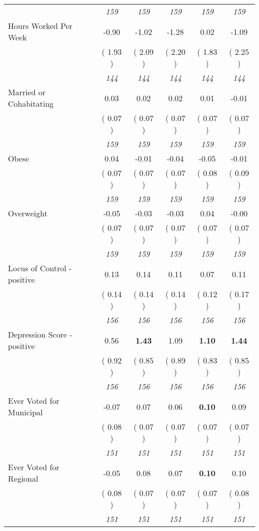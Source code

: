 \begin{tabular}{l c c c c c}
& \textit{ 159 } & \textit{ 159 } & \textit{ 159 } & \textit{ 159 } & \textit{ 159 } \\
Hours Worked Per Week &     -0.90 &     -1.02 &     -1.28 &      0.02 &     -1.09 \\
& (     1.93 ) & (     2.09 ) & (     2.20 ) & (     1.83 ) & (     2.25 ) \\
& \textit{ 144 } & \textit{ 144 } & \textit{ 144 } & \textit{ 144 } & \textit{ 144 } \\
Married or Cohabitating &      0.03 &      0.02 &      0.02 &      0.01 &     -0.01 \\
& (     0.07 ) & (     0.07 ) & (     0.07 ) & (     0.07 ) & (     0.07 ) \\
& \textit{ 159 } & \textit{ 159 } & \textit{ 159 } & \textit{ 159 } & \textit{ 159 } \\
Obese &      0.04 &     -0.01 &     -0.04 &     -0.05 &     -0.01 \\
& (     0.07 ) & (     0.07 ) & (     0.07 ) & (     0.08 ) & (     0.09 ) \\
& \textit{ 159 } & \textit{ 159 } & \textit{ 159 } & \textit{ 159 } & \textit{ 159 } \\
Overweight &     -0.05 &     -0.03 &     -0.03 &      0.04 &     -0.00 \\
& (     0.07 ) & (     0.07 ) & (     0.07 ) & (     0.07 ) & (     0.07 ) \\
& \textit{ 159 } & \textit{ 159 } & \textit{ 159 } & \textit{ 159 } & \textit{ 159 } \\
Locus of Control - positive &      0.13 &      0.14 &      0.11 &      0.07 &      0.11 \\
& (     0.14 ) & (     0.14 ) & (     0.14 ) & (     0.12 ) & (     0.17 ) \\
& \textit{ 156 } & \textit{ 156 } & \textit{ 156 } & \textit{ 156 } & \textit{ 156 } \\
Depression Score - positive &      0.56 & \textbf{      1.43 } &      1.09 & \textbf{     1.10} & \textbf{     1.44} \\
& (     0.92 ) & (     0.85 ) & (     0.89 ) & (     0.83 ) & (     0.85 ) \\
& \textit{ 156 } & \textit{ 156 } & \textit{ 156 } & \textit{ 156 } & \textit{ 156 } \\
Ever Voted for Municipal &     -0.07 &      0.07 &      0.06 & \textbf{     0.10} &      0.09 \\
& (     0.08 ) & (     0.07 ) & (     0.07 ) & (     0.07 ) & (     0.07 ) \\
& \textit{ 151 } & \textit{ 151 } & \textit{ 151 } & \textit{ 151 } & \textit{ 151 } \\
Ever Voted for Regional &     -0.05 &      0.08 &      0.07 & \textbf{     0.10} &      0.10 \\
& (     0.08 ) & (     0.07 ) & (     0.07 ) & (     0.07 ) & (     0.08 ) \\
& \textit{ 151 } & \textit{ 151 } & \textit{ 151 } & \textit{ 151 } & \textit{ 151 } \\
\bottomrule
\end{tabular}
